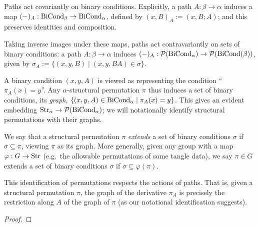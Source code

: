 \begin{definition}
  \label{def:condition-functoriality}
  \leanok
  Paths act covariantly on binary conditions.  Explicitly, a path $A : \beta \to \alpha$ induces a map $(-)_A:\mathrm{BiCond}_\beta \to \mathrm{BiCond}_\alpha$, defined by $(x,B)_A := (x,B;A)$; and this preserves identities and composition.

  Taking inverse images under these maps, paths act contravariantly on sets of binary conditions: a path $A : \beta \to \alpha$ induces $(-)_A : \mathcal{P}(\mathrm{BiCond}_\alpha) \to \mathcal{P}(\mathrm{BiCond}(\beta))$, given by $\sigma_A := \{ (x,y,B) \mid (x,y,BA) \in \sigma \}$.
\end{definition}

\begin{definition}
  \label{def:struct-perm-graph}
  \leanok
  A binary condition $(x,y,A)$ is viewed as representing the condition “$\pi_A(x) = y$”.  Any $\alpha$-structural permutation $\pi$ thus induces a set of binary conditions, its \emph{graph}, $\{ (x,y,A) \in \mathrm{BiCond}_\alpha \mid \pi_A(x) = y \}$.  This gives an evident embedding $\mathrm{Str}_\alpha \to \mathcal{P}(\mathrm{BiCond}_\alpha)$; we will notationally identify structural permutations with their graphs.
\end{definition}

\begin{definition}
  \label{def:struct-perm-extends}
  \leanok
  We say that a structural permutation $\pi$ \emph{extends} a set of binary conditions $\sigma$ if $\sigma \subseteq \pi$, viewing $\pi$ as its graph.  More generally, given any group with a map $\varphi : G \to \mathrm{Str}$ (e.g.\ the allowable permutations of some tangle data), we say $\pi \in G$ extends a set of binary conditions $\sigma$ if $\sigma \subseteq \varphi(\pi)$.
\end{definition}

\begin{proposition}
  \label{prop:conditions-from-perm-restriction}
  \leanok
  This identification of permutations respects the actions of paths.  That is, given a structural permutation $\pi$, the graph of the derivative $\pi_A$ is precisely the restriction along $A$ of the graph of $\pi$ (as our notational identification suggests).
\end{proposition}
\begin{proof}\leanok\end{proof}

